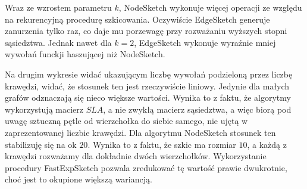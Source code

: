 Wraz ze wzrostem parametru $k$, NodeSketch wykonuje więcej operacji ze względu na rekurencyjną procedurę szkicowania. Oczywiście EdgeSketch generuje zanurzenia tylko raz, co daje mu porzewagę przy rozważaniu wyższych stopni sąsiedztwa. Jednak nawet dla $k = 2$, EdgeSketch wykonuje wyraźnie mniej wywołań funckji haszującej niż NodeSketch.

Na drugim wykresie widać ukazującym liczbę wywołań podzieloną przez liczbę krawędzi, widać, że stosunek ten jest rzeczywiście liniowy. Jedynie dla małych grafów odznaczają się nieco większe wartości. Wynika to z faktu, że algorytmy wykorzystują macierz $SLA$, a nie zwykłą macierz sąsiedztwa, a więc biorą pod uwagę sztuczną pętle od wierzchołka do siebie samego, nie ujętą w zaprezentowanej liczbie krawędzi. Dla algorytmu NodeSketch stosunek ten stabilizuję się na ok $20$. Wynika to z faktu, że szkic ma rozmiar $10$, a każdą z krawędzi rozważamy dla dokładnie dwóch wierzchołków. Wykorzystanie procedury FastExpSketch pozwala zredukować tę wartość prawie dwukrotnie, choć jest to okupione większą wariancją.  
